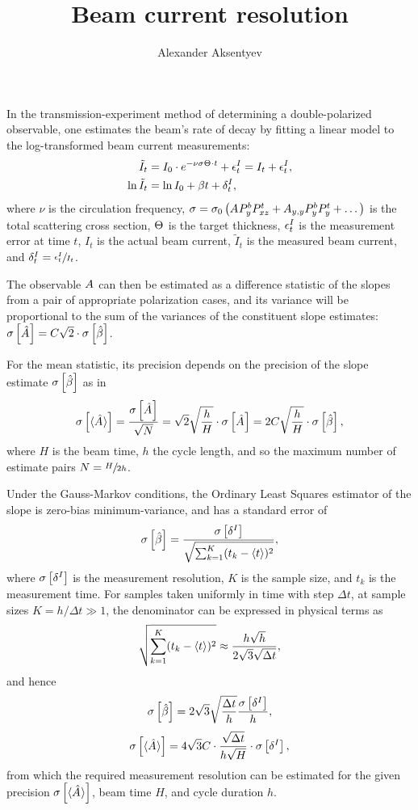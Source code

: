 \documentclass{article}
\newcommand{\Tint}{\Delta t}
\begin{document}
	
\title{Beam current resolution}
\author{Alexander Aksentyev}
\maketitle
	
In the transmission-experiment method of determining a double-polarized observable, one estimates the beam's rate of decay by fitting a linear model to the log-transformed beam current measurements:
\begin{align*}
	\tilde{I}_t  &= I_0 \cdot e^{-\nu\CS\Thick\cdot t} + \err^I_t = I_t + \err^I_t, \\
	\ln \tilde{I}_t &= \ln I_0 + \slp t + \delta^I_t,
\end{align*}
	where $\nu$ is the circulation frequency, $\CS = \CS[0]\bkt{\A P^b_y P^t_{xz} + A_{y,y} P^b_y P^t_y + \dots}$ is the total scattering cross section, $\Thick$ is the target thickness, $\epsilon^I_t$ is the measurement error at time $t$, $I_t$ is the actual beam current, $\tilde{I}_t$ is the measured beam current, and $\delta^I_t = \sfrac{\epsilon^I_t}{I_t}$.


The observable $\A$ can then be estimated as a difference statistic of the slopes from a pair of appropriate polarization cases, and its variance will be proportional to the sum of the variances of the constituent slope estimates: $\SE{\A*} = C\sqrt{2}\cdot\SE{\slp*}$.

For the mean statistic, its precision depends on the precision of the slope estimate $\SE{\slp*}$ as in
\begin{equation}\label{eq:AvgASE}
\SE{\avg{\A*}} = \frac{\SE{\A*}}{\sqrt N} = \sqrt{2}\sqrt{\frac hH}\cdot\SE{\A*} = 2C\sqrt{\frac hH}\cdot\SE{\slp*},
\end{equation}
where $H$ is the beam time, $h$ the cycle length, and so the maximum number of estimate pairs $N = \sfrac{H}{2h}$.

Under the Gauss-Markov conditions, the Ordinary Least Squares estimator of the slope is zero-bias minimum-variance, and has a standard error of
\begin{equation}\label{eq:SlpVarGM}
\SE{\slp*} = \frac{\SE{\delta^I}}{\sqrt{\sum_{k=1}^K (t_k - \avg{t})^2}},
\end{equation}
where $\SE{\delta^I}$ is the measurement resolution, $K$ is the sample size, and $t_k$ is the measurement time. For samples taken uniformly in time with step $\Tint$, at sample sizes $K = h/\Tint \gg 1$, the denominator can be expressed in physical terms as
\[
\sqrt{\sum_{k=1}^K (t_k - \avg{t})^2} \approx \frac{h\sqrt{h}}{2\sqrt{3}\sqrt{\Tint}},
\]
and hence 
\begin{equation}\label{eq:SlpVar}
	\SE{\slp*} = 2\sqrt{3}\sqrt{\frac{\Delta t}{h}}\frac{\SE{\delta^I}}{h},
\end{equation}
\begin{equation}
	\SE{\avg{\A*}} = 4\sqrt{3}C\cdot \frac{\sqrt{\Tint}}{h\sqrt{H}}\cdot\SE{\delta^I},
\end{equation}
from which the required measurement resolution can be estimated for the given precision $\SE{\avg{\A*}}$, beam time $H$, and cycle duration $h$.
\end{document}
